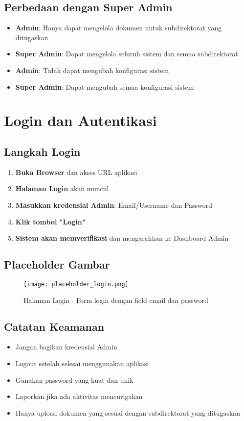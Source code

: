 \documentclass[12pt,a4paper]{article}
\begin{document}
\subsection{Perbedaan dengan Super Admin}
\begin{itemize}
\item \textbf{Admin}: Hanya dapat mengelola dokumen untuk subdirektorat yang ditugaskan
\item \textbf{Super Admin}: Dapat mengelola seluruh sistem dan semua subdirektorat
\item \textbf{Admin}: Tidak dapat mengubah konfigurasi sistem
\item \textbf{Super Admin}: Dapat mengubah semua konfigurasi sistem
\end{itemize}

\section{Login dan Autentikasi}

\subsection{Langkah Login}
\begin{enumerate}
\item \textbf{Buka Browser} dan akses URL aplikasi
\item \textbf{Halaman Login} akan muncul
\item \textbf{Masukkan kredensial Admin}: Email/Username dan Password
\item \textbf{Klik tombol "Login"}
\item \textbf{Sistem akan memverifikasi} dan mengarahkan ke Dashboard Admin
\end{enumerate}

\subsection{Placeholder Gambar}
\begin{figure}[H]
\centering
\texttt{[image: placeholder\_login.png]}
\caption{Halaman Login - Form login dengan field email dan password}
\label{fig:login}
\end{figure}

\subsection{Catatan Keamanan}
\begin{itemize}
\item Jangan bagikan kredensial Admin
\item Logout setelah selesai menggunakan aplikasi
\item Gunakan password yang kuat dan unik
\item Laporkan jika ada aktivitas mencurigakan
\item Hanya upload dokumen yang sesuai dengan subdirektorat yang ditugaskan
\end{itemize}
\end{document}

